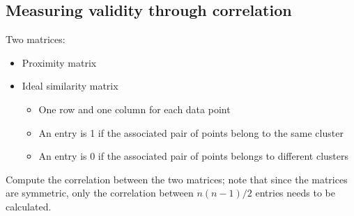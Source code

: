 \subsection{Measuring validity through correlation}

Two matrices:
\begin{itemize}
   \item Proximity matrix
   \item Ideal similarity matrix
   \begin{itemize}
      \item One row and one column for each data point
      \item An entry is 1 if the associated pair of points belong to the same cluster
      \item An entry is 0 if the associated pair of points belongs to different clusters
   \end{itemize}
\end{itemize}

Compute the correlation between the two matrices; note that since the matrices are symmetric, only the correlation between
$n(n-1) / 2$ entries needs to be calculated.
